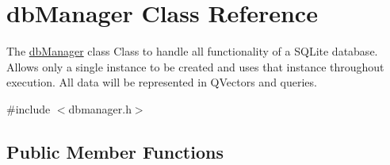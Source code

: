 \hypertarget{classdb_manager}{}\section{db\+Manager Class Reference}
\label{classdb_manager}


The \mbox{\hyperlink{classdb_manager}{db\+Manager}} class Class to handle all functionality of a S\+Q\+Lite database. Allows only a single instance to be created and uses that instance throughout execution. All data will be represented in Q\+Vectors and queries.  




{\ttfamily \#include $<$dbmanager.\+h$>$}

\subsection*{Public Member Functions}

